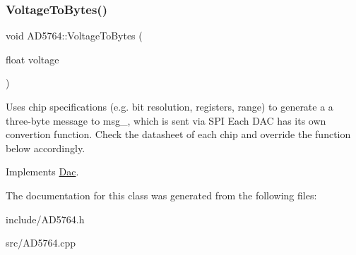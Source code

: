 \subsubsection{\texorpdfstring{Voltage\+To\+Bytes()}{VoltageToBytes()}}
{\footnotesize\ttfamily void A\+D5764\+::\+Voltage\+To\+Bytes (\begin{DoxyParamCaption}\item[{float}]{voltage }\end{DoxyParamCaption})\hspace{0.3cm}{\ttfamily [virtual]}}

Uses chip specifications (e.\+g. bit resolution, registers, range) to generate a a three-\/byte message to msg\+\_\+, which is sent via S\+PI Each D\+AC has its own convertion function. Check the datasheet of each chip and override the function below accordingly. 

Implements \mbox{\hyperlink{classDac_ac21022b2b921437418004af9ae7de8ae}{Dac}}.



The documentation for this class was generated from the following files\+:\begin{DoxyCompactItemize}
\item 
include/A\+D5764.\+h\item 
src/A\+D5764.\+cpp\end{DoxyCompactItemize}
